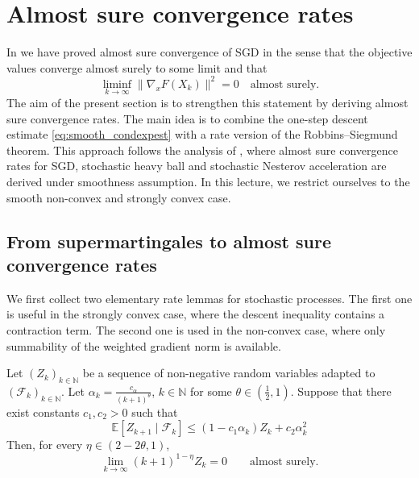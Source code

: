 \documentclass[12pt,openany]{book}
\theoremstyle{definition}
\theoremstyle{definition}
\newcommand{\N}{\mathbb{N}}
\begin{document}
\section{Almost sure convergence rates}\label{sec:as_rates}
In  we have proved almost sure convergence of SGD in the sense that the objective values converge almost surely to some limit and that
\[ \liminf_{k\to\infty} \|\nabla_x F(X_k)\|^2=0\quad \text{almost surely}.\]
The aim of the present section is to strengthen this statement by deriving almost sure convergence rates. The main idea is to combine the one-step descent estimate \eqref{eq:smooth_condexpest} with a rate version of the Robbins--Siegmund theorem. This approach follows the analysis of \cite{LY2022,pmlr-v134-sebbouh21a}, where almost sure convergence rates for SGD, stochastic heavy ball and stochastic Nesterov acceleration are derived under smoothness assumption. In this lecture, we restrict ourselves to the smooth non-convex and strongly convex case. 

\subsection{From supermartingales to almost sure convergence rates}
We first collect two elementary rate lemmas for stochastic processes. The first one is useful in the strongly convex case, where the descent inequality contains a contraction term. The second one is used in the non-convex case, where only summability of the weighted gradient norm is available.

\begin{lemma}\label{lem:asrates}
Let $(Z_k)_{k\in\mathbb{N}}$ be a sequence of non-negative random variables adapted to $(\mathcal{F}_k)_{k\in\mathbb{N}}$. Let \(\alpha_k=\frac{c_\alpha}{(k+1)^{\theta}}\), $k\in\N$ for some $\theta\in(\frac12,1)$. Suppose that there exist constants $c_1,c_2>0$ such that
\[
\mathbb{E}[Z_{k+1}\mid \mathcal{F}_k]
\leq
(1-c_1\alpha_k)Z_k+c_2\alpha_k^2
\]
Then, for every $\eta\in(2-2\theta,1)$,  
\[
\lim_{k\to\infty} (k+1)^{1-\eta}Z_k=0
\qquad \text{almost surely}.
\]
\end{lemma}
\end{document}
